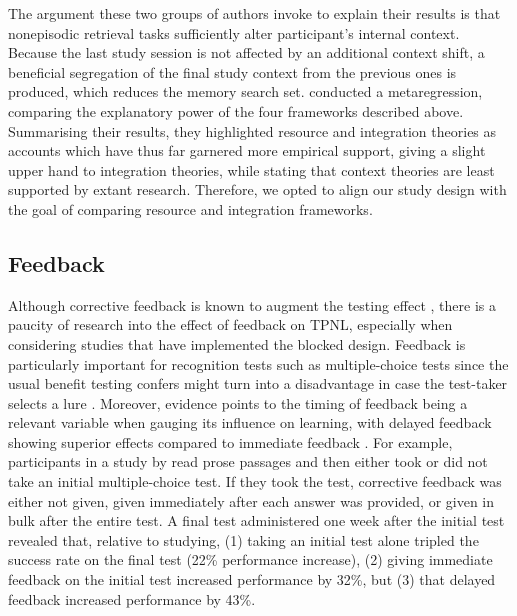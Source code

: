 \documentclass[../main.tex]{subfiles}
\begin{document}
The argument these two groups of authors invoke to explain their results is that nonepisodic retrieval tasks sufficiently alter participant's internal context. Because the last study session is not affected by an additional context shift, a beneficial segregation of the final study context from the previous ones is produced, which reduces the memory search set. \cite{chanRetrievalPotentiatesNew2018} conducted a metaregression, comparing the explanatory power of the four frameworks described above. Summarising their results, they highlighted resource and integration theories as accounts which have thus far garnered more empirical support, giving a slight upper hand to integration theories, while stating that context theories are least supported by extant research. Therefore, we opted to align our study design with the goal of comparing resource and integration frameworks.

\hypertarget{feedback}{%
\subsection{Feedback}}

Although corrective feedback is known to augment the testing effect 
\citep{roedigeriiiCriticalRoleRetrieval2011}, there is a paucity of research 
into the effect of feedback on TPNL, especially when considering studies that 
have implemented the blocked design. Feedback is particularly important for 
recognition tests such as multiple-choice tests since the usual benefit testing 
confers might turn into a disadvantage in case the test-taker selects a lure 
\citep{roedigerPositiveNegativeConsequences2005, 
marshMemorialConsequencesMultiplechoice2007}. Moreover, evidence points to the 
timing of feedback being a relevant variable when gauging its influence on 
learning, with delayed feedback showing superior effects compared to immediate 
feedback 
\citep{metcalfeDelayedImmediateFeedback2009,butlerEffectTypeTiming2007, 
butlerFeedbackEnhancesPositive2008,smithLearningFeedbackSpacing2010}.
 For example, participants in a study by 
\cite{butlerFeedbackEnhancesPositive2008} read prose passages and then either 
took or did not take an initial multiple-choice test. If they took the test, 
corrective feedback was either not given, given immediately after each answer 
was provided, or given in bulk after the entire test. A final test administered 
one week after the initial test revealed that, relative to studying, (1) taking 
an initial test alone tripled the success rate on the final test (22\% 
performance increase), (2) giving immediate feedback on the initial test 
increased performance by 32\%, but (3) that delayed feedback increased 
performance by 43\%.
\end{document}
